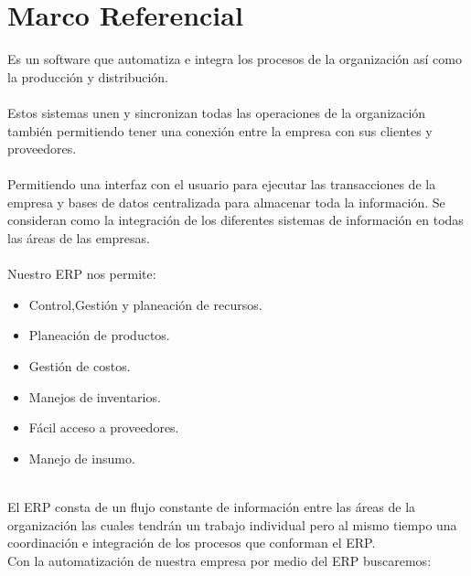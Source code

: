\chapter{Marco Referencial}
%
Es un  software que   automatiza e integra  los procesos de la organizaci\'on  as\'i como la  producci\'on y distribuci\'on.
%
\\%
\\%
Estos sistemas  unen y sincronizan todas las operaciones de la organizaci\'on tambi\'en  permitiendo tener una conexi\'on entre la empresa  con sus clientes y proveedores.
\\%
\\%
Permitiendo una interfaz con el usuario para ejecutar las transacciones de la empresa y bases de datos centralizada para almacenar toda la informaci\'on. Se consideran como  la  integraci\'on de los diferentes sistemas de informaci\'on en todas las \'areas de las empresas.
\\%
\\%
Nuestro ERP nos permite:
\\%
\begin{itemize}
	\item Control,Gesti\'on y planeaci\'on de recursos.
	\item Planeaci\'on de productos.
	\item Gesti\'on de costos.
	\item Manejos de inventarios.
	\item F\'acil acceso a proveedores.
	\item Manejo de insumo.
\end{itemize}
\\%
El ERP consta de un flujo constante de informaci\'on entre las \'areas de la organizaci\'on las cuales tendr\'an un trabajo individual pero al mismo tiempo una coordinaci\'on e integraci\'on de los procesos que conforman el ERP.
\\%
Con la automatizaci\'on de nuestra empresa por medio del ERP buscaremos:
\\%

